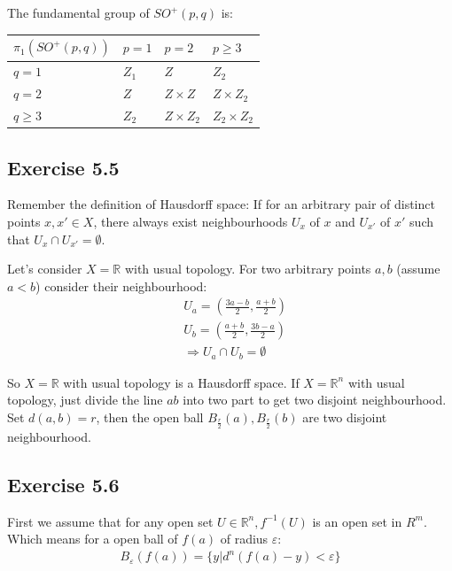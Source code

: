 \documentclass[]{ctexart}
\begin{document}
				The fundamental group of $ SO^+(p, q) $ is:
					\begin{center}
							\begin{tabular}{|l|l|l|l|}
								\hline
								$\pi_1(SO^+(p,q))$ & $p=1$ & $p=2$         & $p\geq 3$       \\ \hline
								$q=1$              & $Z_1$ & $Z$           & $Z_2$           \\ \hline
								$q=2$              & $Z$   & $Z\times Z$   & $Z\times Z_2$   \\ \hline
								$q\geq 3$          & $Z_2$ & $Z\times Z_2$ & $Z_2\times Z_2$ \\ \hline
							\end{tabular}
					\end{center}
	
	\subsection{Exercise 5.5}
		Remember the definition of Hausdorff space: If for an arbitrary pair of distinct points $x,x'\in X$, there always exist neighbourhoods $U_x$ of $x$ and $U_{x'}$ of $x'$ such that $U_x\cap U_{x'}=\emptyset$. 
		
		Let's consider $X=\mathbb{R}$ with usual topology. For two arbitrary points $a,b$ (assume $ a<b $) consider their neighbourhood: 	
			\begin{equation*}
			\begin{aligned}
				&U_a=(\frac{3a-b}{2},\frac{a+b}{2})\\
				&U_b=(\frac{a+b}{2},\frac{3b-a}{2})\\
				&\Rightarrow U_a\cap U_b=\emptyset
			\end{aligned}
			\end{equation*}
			
		So $X=\mathbb{R}$ with usual topology is a Hausdorff space. If $X=\mathbb{R}^n$ with usual topology, just divide the line $ab$ into two part to get two disjoint neighbourhood. Set $d(a,b)=r$, then the open ball $B_{\frac{r}{2}}(a),B_{\frac{r}{2}}(b)$ are two disjoint neighbourhood. 
	
	\subsection{Exercise 5.6}
		First we assume that for any open set $ U\in \mathbb{R}^n, f^{-1}(U) $  is an open set in $ R^m $. Which means for a open ball of $f(a)$ of radius $\varepsilon$:
			\begin{equation*}
			\begin{aligned}
				B_{\varepsilon}(f(a))=\{y|d^n(f(a)-y)<\varepsilon\}
			\end{aligned}
			\end{equation*}
			
\end{document}
